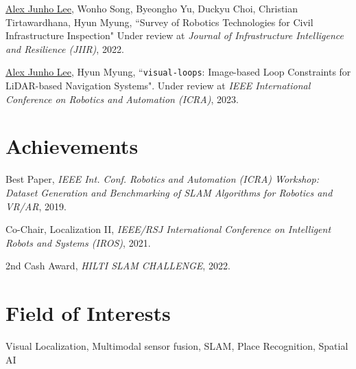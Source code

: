 \documentclass[margin]{res}
\begin{document}
\begin{resume}
		\par\underline{Alex Junho Lee}, Wonho Song, Byeongho Yu, Duckyu Choi, Christian Tirtawardhana, Hyun Myung, ``Survey of Robotics Technologies for Civil Infrastructure Inspection" Under review at \textit{Journal of Infrastructure Intelligence and Resilience (JIIR)}, 2022.
			
		\par\underline{Alex Junho Lee}, Hyun Myung, ``\texttt{visual-loops}: Image-based Loop Constraints for LiDAR-based Navigation Systems". Under review at \textit{IEEE International Conference on Robotics and Automation (ICRA)}, 2023.
		
		\section{Achievements}
		
		\par Best Paper,\textit{ IEEE Int. Conf. Robotics and Automation (ICRA) Workshop: Dataset Generation and Benchmarking of SLAM Algorithms for Robotics and VR/AR}, 2019.
						
		\par Co-Chair, Localization II, \textit{IEEE/RSJ International Conference on Intelligent Robots and Systems (IROS)}, 2021.
		
		\par 2nd Cash Award, \textit{HILTI SLAM CHALLENGE}, 2022.
		
				
		\section{Field of Interests}
		Visual Localization, Multimodal sensor fusion, SLAM, Place Recognition, Spatial AI
		\newpage

\end{resume}
\end{document}
